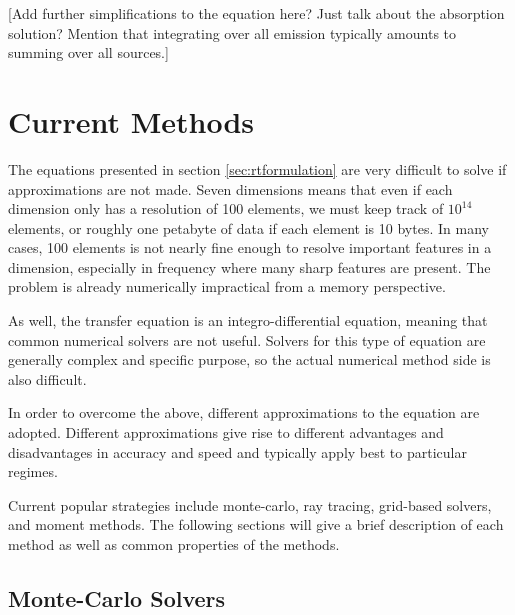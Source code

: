 [Add further simplifications to the equation here? Just talk about the absorption solution? Mention that integrating over all emission typically amounts to summing over all sources.]

%

\section{Current Methods}
\label{sec:currentmethods}

The equations presented in section \ref{sec:rtformulation} are very difficult to solve if approximations are not made. Seven dimensions means that even if each dimension only has a resolution of 100 elements, we must keep track of $10^14$ elements, or roughly one petabyte of data if each element is 10 bytes. In many cases, 100 elements is not nearly fine enough to resolve important features in a dimension, especially in frequency where many sharp features are present. The problem is already numerically impractical from a memory perspective.

As well, the transfer equation is an integro-differential equation, meaning that common numerical solvers are not useful. Solvers for this type of equation are generally complex and specific purpose, so the actual numerical method side is also difficult.

In order to overcome the above, different approximations to the equation are adopted. Different approximations give rise to different advantages and disadvantages in accuracy and speed and typically apply best to particular regimes.

Current popular strategies include monte-carlo, ray tracing, grid-based solvers, and moment methods. The following sections will give a brief description of each method as well as common properties of the methods.

\subsection{Monte-Carlo Solvers}
\label{sec:montecarlo}

